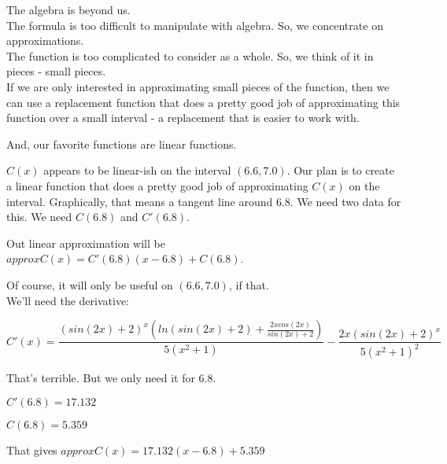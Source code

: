 \documentclass{ximera}
\begin{document}
The algebra is beyond us. \\




The formula is too difficult to manipulate with algebra.  So, we concentrate on approximations. \\ 


The function is too complicated to consider as a whole. So, we think of it in pieces - small pieces. \\






If we are only interested in approximating small pieces of the function, then we can use a replacement function that does a pretty good job of approximating this function over a small interval - a replacement that is easier to work with.

And, our favorite functions are linear functions.


$C(x)$ appears to be linear-ish on the interval $(6.6, 7.0)$. Our plan is to create a linear function that does a pretty good job of approximating $C(x)$ on the interval. Graphically, that means a tangent line around $6.8$.  We need two data for this.  We need $C(6.8)$ and $C'(6.8)$.





Out linear approximation will be $approxC(x) = C'(6.8)(x-6.8) + C(6.8)$.

Of course, it will only be useful on $(6.6, 7.0)$, if that. \\




We'll need the derivative:

\[  
C'(x) = \frac{(sin(2x)+2)^x (ln(sin(2x)+2) + \frac{2 x cos(2x)}{sin(2x)+2})}{5(x^2+1)} - \frac{2x(sin(2x)+2)^x}{5(x^2+1)^2}
\]




That's terrible.  But we only need it for $6.8$.

$C'(6.8) = 17.132$


$C(6.8) = 5.359$


That gives $approxC(x) = 17.132(x-6.8)+5.359$
\end{document}
